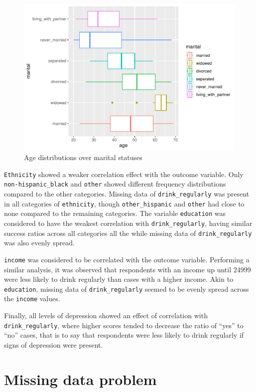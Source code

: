 \documentclass[
]{article}
\begin{document}
\begin{figure}
\centering
\includegraphics{report_files/figure-latex/age-marital-1.pdf}
\caption{\label{fig:age-marital}Age distributions over marital statuses}
\end{figure}

\texttt{Ethnicity} showed a weaker correlation effect with the outcome variable. Only \texttt{non-hispanic\_black} and \texttt{other} showed different frequency distributions compared to the other categories. Missing data of \texttt{drink\_regularly} was present in all categories of \texttt{ethnicity}, though \texttt{other\_hispanic} and \texttt{other} had close to none compared to the remaining categories.
The variable \texttt{education} was considered to have the weakest correlation with \texttt{drink\_regularly}, having similar success ratios across all categories all the while missing data of \texttt{drink\_regularly} was also evenly spread.

\texttt{income} was considered to be correlated with the outcome variable. Performing a similar analysis, it was observed that respondents with an income up until 24999 were less likely to drink regularly than cases with a higher income. Akin to \texttt{education}, missing data of \texttt{drink\_regularly} seemed to be evenly spread across the \texttt{income} values.

Finally, all levels of depression showed an effect of correlation with \texttt{drink\_regularly}, where higher scores tended to decrease the ratio of ``yes'' to ``no'' cases, that is to say that respondents were less likely to drink regularly if signs of depression were present.

\hypertarget{missing-data-problem}{%
\section{Missing data problem}\label{missing-data-problem}}
\end{document}
